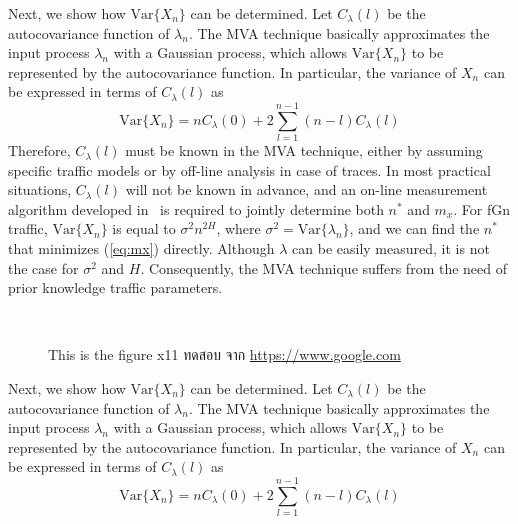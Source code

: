 \documentclass[12pt,oneside,openright,a4paper]{cpe-thai-project}
\begin{document}
Next, we show how $\mathrm{Var}\{X_n\}$ can be determined.  Let
$C_{\lambda}(l)$ be the autocovariance function of $\lambda_n$.  The
MVA technique basically approximates the input process $\lambda_n$
with a Gaussian process, which allows $\mathrm{Var}\{X_n\}$ to be
represented by the autocovariance function.  In particular, the
variance of $X_n$ can be expressed in terms of $C_{\lambda}(l)$ as
\begin{equation}
    \mathrm{Var}\{X_n\} = nC_{\lambda}(0) + 2\sum_{l=1}^{n-1} (n-l)C_{\lambda}(l)
\end{equation}
Therefore, $C_{\lambda}(l)$ must be known in the MVA technique, either
by assuming specific traffic models or by off-line analysis in case of
traces.  In most practical situations, $C_{\lambda}(l)$ will not be
known in advance, and an on-line measurement algorithm developed
in~\cite{eun01} is required to jointly determine both $n^\ast$ and
$m_x$. For fGn traffic, $\mathrm{Var}\{X_n\}$ is equal to $\sigma^2
    n^{2H}$, where $\sigma^2 = \mathrm{Var}\{\lambda_n\}$, and we can find
the $n^\ast$ that minimizes (\ref{eq:mx}) directly. Although $\lambda$
can be easily measured, it is not the case for $\sigma^2$ and $H$.
Consequently, the MVA technique suffers from the need of prior
knowledge traffic parameters.


 \\


\begin{figure}[!h]
    \caption{This is the figure x11 ทดสอบ จาก \href{https://www.google.com} {https://www.google.com}}\label{fig:x1}
\end{figure}

Next, we show how $\mathrm{Var}\{X_n\}$ can be determined.  Let
$C_{\lambda}(l)$ be the autocovariance function of $\lambda_n$.  The
MVA technique basically approximates the input process $\lambda_n$
with a Gaussian process, which allows $\mathrm{Var}\{X_n\}$ to be
represented by the autocovariance function.  In particular, the
variance of $X_n$ can be expressed in terms of $C_{\lambda}(l)$ as
\begin{equation}
    \mathrm{Var}\{X_n\} = nC_{\lambda}(0) + 2\sum_{l=1}^{n-1} (n-l)C_{\lambda}(l)
\end{equation}

 \\
\end{document}
